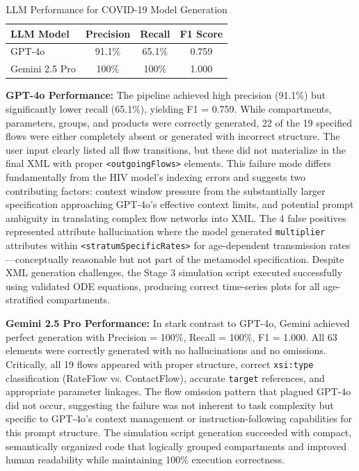 \begin{table}[htbp]
\centering
\caption{LLM Performance for COVID-19 Model Generation}
\label{tab:covid_llm_performance}
\begin{tabular}{lccc}
\hline
\textbf{LLM Model} & \textbf{Precision} & \textbf{Recall} & \textbf{F1 Score} \\
\hline
GPT-4o & 91.1\% & 65.1\% & 0.759 \\
Gemini 2.5 Pro & 100\% & 100\% & 1.000 \\
\hline
\end{tabular}
\end{table}

\textbf{GPT-4o Performance:} The pipeline achieved high precision (91.1\%) but significantly lower recall (65.1\%), yielding F1 = 0.759. While compartments, parameters, groups, and products were correctly generated, 22 of the 19 specified flows were either completely absent or generated with incorrect structure. The user input clearly listed all flow transitions, but these did not materialize in the final XML with proper \texttt{<outgoingFlows>} elements. This failure mode differs fundamentally from the HIV model's indexing errors and suggests two contributing factors: context window pressure from the substantially larger specification approaching GPT-4o's effective context limits, and potential prompt ambiguity in translating complex flow networks into XML. The 4 false positives represented attribute hallucination where the model generated \texttt{multiplier} attributes within \texttt{<stratumSpecificRates>} for age-dependent transmission rates—conceptually reasonable but not part of the metamodel specification. Despite XML generation challenges, the Stage 3 simulation script executed successfully using validated ODE equations, producing correct time-series plots for all age-stratified compartments.

\textbf{Gemini 2.5 Pro Performance:} In stark contrast to GPT-4o, Gemini achieved perfect generation with Precision = 100\%, Recall = 100\%, F1 = 1.000. All 63 elements were correctly generated with no hallucinations and no omissions. Critically, all 19 flows appeared with proper structure, correct \texttt{xsi:type} classification (RateFlow vs. ContactFlow), accurate \texttt{target} references, and appropriate parameter linkages. The flow omission pattern that plagued GPT-4o did not occur, suggesting the failure was not inherent to task complexity but specific to GPT-4o's context management or instruction-following capabilities for this prompt structure. The simulation script generation succeeded with compact, semantically organized code that logically grouped compartments and improved human readability while maintaining 100\% execution correctness.

